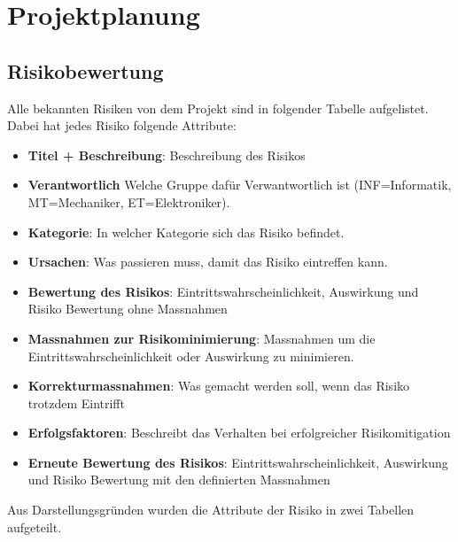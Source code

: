 \newpage
\section{Projektplanung}

\subsection{Risikobewertung}

Alle bekannten Risiken von dem Projekt sind in folgender Tabelle aufgelistet.
Dabei hat jedes Risiko folgende Attribute:
\begin{itemize}
    \item \textbf{Titel + Beschreibung}: Beschreibung des Risikos
    \item \textbf{Verantwortlich} Welche Gruppe dafür Verwantwortlich ist (INF=Informatik, MT=Mechaniker, ET=Elektroniker).
    \item \textbf{Kategorie}: In welcher Kategorie sich das Risiko befindet.
    \item \textbf{Ursachen}: Was passieren muss, damit das Risiko eintreffen kann.
    \item \textbf{Bewertung des Risikos}: Eintrittswahrscheinlichkeit, Auswirkung und Risiko Bewertung ohne Massnahmen
    \item \textbf{Massnahmen zur Risikominimierung}: Massnahmen um die Eintrittswahrscheinlichkeit oder Auswirkung zu minimieren.
    \item \textbf{Korrekturmassnahmen}: Was gemacht werden soll, wenn das Risiko trotzdem Eintrifft
    \item \textbf{Erfolgsfaktoren}: Beschreibt das Verhalten bei erfolgreicher Risikomitigation
    \item \textbf{Erneute Bewertung des Risikos}: Eintrittswahrscheinlichkeit, Auswirkung und Risiko Bewertung mit den definierten Massnahmen
\end{itemize}

Aus Darstellungsgründen wurden die Attribute der Risiko in zwei Tabellen aufgeteilt.


